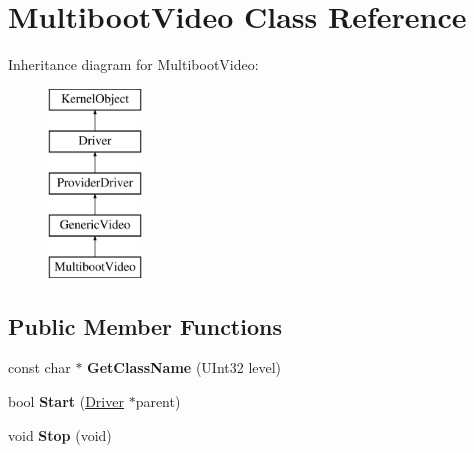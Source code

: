 \hypertarget{class_multiboot_video}{}\section{Multiboot\+Video Class Reference}
\label{class_multiboot_video}
Inheritance diagram for Multiboot\+Video\+:\begin{figure}[H]
\begin{center}
\leavevmode
\includegraphics[height=5.000000cm]{class_multiboot_video}
\end{center}
\end{figure}
\subsection*{Public Member Functions}
\begin{DoxyCompactItemize}
\item 
\mbox{\label{class_multiboot_video_acefc165a7e93db517f46af0d9b55e025}} 
const char $\ast$ {\bfseries Get\+Class\+Name} (U\+Int32 level)
\item 
\mbox{\label{class_multiboot_video_a1322464ae0ec12bf4f986a6fa3b10922}} 
bool {\bfseries Start} (\hyperlink{class_driver}{Driver} $\ast$parent)
\item 
\mbox{\label{class_multiboot_video_a126e8825edb795129878cc4bdbf1c6f7}} 
void {\bfseries Stop} (void)
\end{DoxyCompactItemize}
